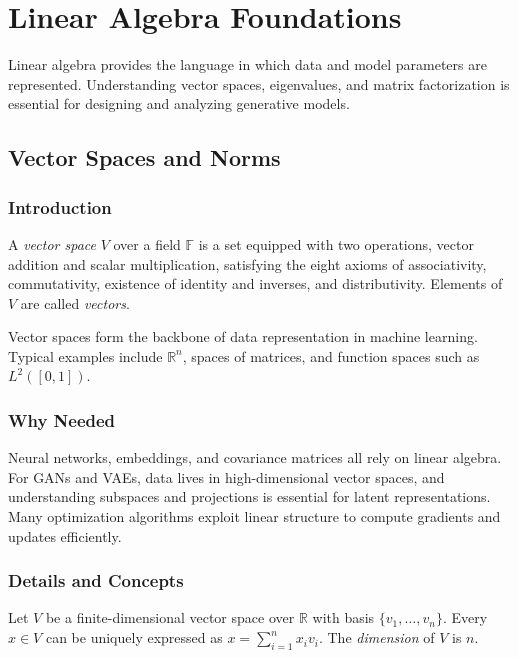 \chapter{Linear Algebra Foundations}\label{sec:la}
Linear algebra provides the language in which data and model parameters are represented. Understanding vector spaces, eigenvalues, and matrix factorization is essential for designing and analyzing generative models.

\section{Vector Spaces and Norms}
\subsection{Introduction}
\begin{definition}
A \emph{vector space} $V$ over a field $\mathbb{F}$ is a set equipped with two operations, vector addition and scalar multiplication, satisfying the eight axioms of associativity, commutativity, existence of identity and inverses, and distributivity. Elements of $V$ are called \emph{vectors}.
\end{definition}
Vector spaces form the backbone of data representation in machine learning. Typical examples include $\mathbb{R}^n$, spaces of matrices, and function spaces such as $L^2([0,1])$.

\subsection{Why Needed}
Neural networks, embeddings, and covariance matrices all rely on linear algebra. For GANs and VAEs, data lives in high-dimensional vector spaces, and understanding subspaces and projections is essential for latent representations. Many optimization algorithms exploit linear structure to compute gradients and updates efficiently.

\subsection{Details and Concepts}
Let $V$ be a finite-dimensional vector space over $\mathbb{R}$ with basis $\{v_1,\dots,v_n\}$. Every $x\in V$ can be uniquely expressed as $x=\sum_{i=1}^n x_i v_i$. The \emph{dimension} of $V$ is $n$.

